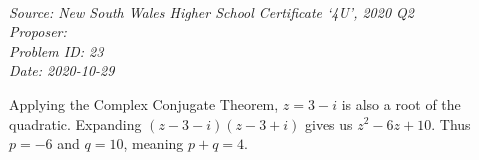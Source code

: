 \SSbreak\\
\emph{Source: New South Wales Higher School Certificate `4U', 2020 Q2}\\
\emph{Proposer: \Pbrain}\\
\emph{Problem ID: 23}\\
\emph{Date: 2020-10-29}\\
\SSbreak

\bigskip

\begin{solution}\hfil\medskip
    
    Applying the Complex Conjugate Theorem, $z=3-i$ is also a root of the quadratic. 
    Expanding $(z-3-i)(z-3+i)$ gives us $z^2-6z+10$. Thus $p = -6$ and $q = 10$, meaning $p + q = \boxed{4}$.
\end{solution}\bigskip